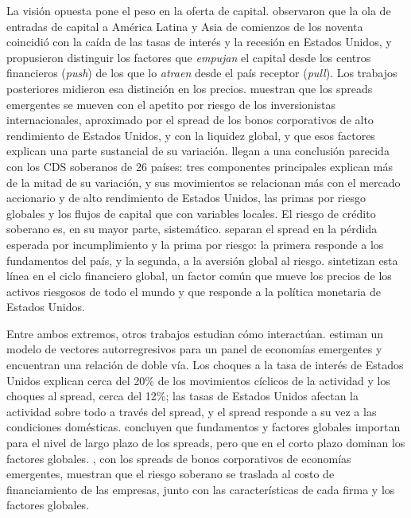 La visión opuesta pone el peso en la oferta de capital. \citet{CalvoLeidermanReinhart1996} observaron que la ola de entradas de capital a América Latina y Asia de comienzos de los noventa coincidió con la caída de las tasas de interés y la recesión en Estados Unidos, y propusieron distinguir los factores que \emph{empujan} el capital desde los centros financieros (\textit{push}) de los que lo \emph{atraen} desde el país receptor (\textit{pull}). Los trabajos posteriores midieron esa distinción en los precios. \citet{GonzalezRozadaLevyYeyati2008} muestran que los spreads emergentes se mueven con el apetito por riesgo de los inversionistas internacionales, aproximado por el spread de los bonos corporativos de alto rendimiento de Estados Unidos, y con la liquidez global, y que esos factores explican una parte sustancial de su variación. \citet{LongstaffEtAl2011} llegan a una conclusión parecida con los CDS soberanos de 26 países: tres componentes principales explican más de la mitad de su variación, y sus movimientos se relacionan más con el mercado accionario y de alto rendimiento de Estados Unidos, las primas por riesgo globales y los flujos de capital que con variables locales. El riesgo de crédito soberano es, en su mayor parte, sistemático. \citet{RemolonaScatignaWu2008} separan el spread en la pérdida esperada por incumplimiento y la prima por riesgo: la primera responde a los fundamentos del país, y la segunda, a la aversión global al riesgo. \citet{MirandaAgrippinoRey2022} sintetizan esta línea en el ciclo financiero global, un factor común que mueve los precios de los activos riesgosos de todo el mundo y que responde a la política monetaria de Estados Unidos.

Entre ambos extremos, otros trabajos estudian cómo interactúan. \citet{UribeYue2006} estiman un modelo de vectores autorregresivos para un panel de economías emergentes y encuentran una relación de doble vía. Los choques a la tasa de interés de Estados Unidos explican cerca del 20\% de los movimientos cíclicos de la actividad y los choques al spread, cerca del 12\%; las tasas de Estados Unidos afectan la actividad sobre todo a través del spread, y el spread responde a su vez a las condiciones domésticas. \citet{CsontoIvaschenko2013} concluyen que fundamentos y factores globales importan para el nivel de largo plazo de los spreads, pero que en el corto plazo dominan los factores globales. \citet{CavalloValenzuela2010}, con los spreads de bonos corporativos de economías emergentes, muestran que el riesgo soberano se traslada al costo de financiamiento de las empresas, junto con las características de cada firma y los factores globales.

